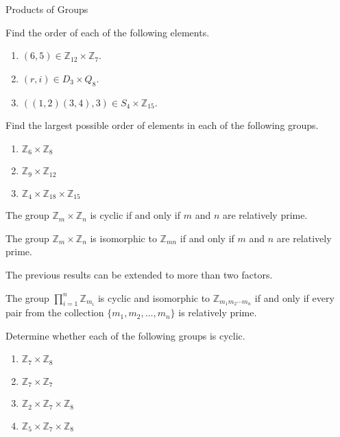 \begin{section}{Products of Groups}
\begin{problem}
Find the order of each of the following elements.
\begin{enumerate}[label=\rm{(\alph*)}]
\item $(6,5)\in\mathbb{Z}_{12}\times \mathbb{Z}_7$.
\item $(r,i)\in D_3\times Q_8$.
\item $((1,2)(3,4),3)\in S_4\times \mathbb{Z}_{15}$.
\end{enumerate}
\end{problem}

\begin{problem}
Find the largest possible order of elements in each of the following groups.
\begin{enumerate}[label=\rm{(\alph*)}]
\item $\mathbb{Z}_6\times \mathbb{Z}_8$
\item $\mathbb{Z}_9\times \mathbb{Z}_{12}$
\item $\mathbb{Z}_4\times \mathbb{Z}_{18}\times \mathbb{Z}_{15}$
\end{enumerate}
\end{problem}

\begin{theorem}
The group $\mathbb{Z}_m\times \mathbb{Z}_n$ is cyclic if and only if $m$ and $n$ are relatively prime.
\end{theorem}

\begin{corollary}
The group $\mathbb{Z}_m\times \mathbb{Z}_n$ is isomorphic to $\mathbb{Z}_{mn}$ if and only if $m$ and $n$ are relatively prime.
\end{corollary}

The previous results can be extended to more than two factors.

\begin{theorem}
The group $\prod_{i=1}^n \mathbb{Z}_{m_i}$ is cyclic and isomorphic to $\mathbb{Z}_{m_1m_2\cdots m_n}$ if and only if every pair from the collection $\{m_1,m_2,\ldots, m_n\}$ is relatively prime.
\end{theorem}

\begin{problem}
Determine whether each of the following groups is cyclic.
\begin{enumerate}[label=\rm{(\alph*)}]
\item $\mathbb{Z}_7\times \mathbb{Z}_8$
\item $\mathbb{Z}_7\times \mathbb{Z}_7$
\item $\mathbb{Z}_2\times \mathbb{Z}_7\times \mathbb{Z}_8$
\item $\mathbb{Z}_5\times \mathbb{Z}_7\times \mathbb{Z}_8$
\end{enumerate}
\end{problem}


\end{section}
